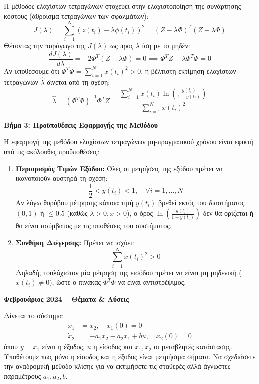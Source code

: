\documentclass[a4paper,11pt]{article}
\newcommand{\examyear}[1]{\def\currentexamyear{#1}\markboth{#1}{#1}}
\def\currentexamyear{}
\begin{document}
\begin{answer}
Η μέθοδος ελαχίστων τετραγώνων στοχεύει στην ελαχιστοποίηση της συνάρτησης κόστους (άθροισμα τετραγώνων των σφαλμάτων):
\[ J(\lambda) = \sum_{i=1}^N \left( z(t_i) - \lambda \phi(t_i) \right)^2 = (Z - \lambda \Phi)^T (Z - \lambda \Phi) \]
Θέτοντας την παράγωγο της $J(\lambda)$ ως προς $\lambda$ ίση με το μηδέν:
\[ \frac{d J(\lambda)}{d \lambda} = -2 \Phi^T (Z - \lambda \Phi) = 0 \implies \Phi^T Z - \lambda \Phi^T \Phi = 0 \]
Αν υποθέσουμε ότι $\Phi^T \Phi = \sum_{i=1}^N x(t_i)^2 > 0$, η βέλτιστη εκτίμηση ελαχίστων τετραγώνων $\hat{\lambda}$ δίνεται από τη σχέση:
\[ \hat{\lambda} = (\Phi^T \Phi)^{-1} \Phi^T Z = \frac{\sum_{i=1}^N x(t_i) \ln\left(\frac{y(t_i)}{1 - y(t_i)}\right)}{\sum_{i=1}^N x(t_i)^2} \]

\textbf{Βήμα 3: Προϋποθέσεις Εφαρμογής της Μεθόδου}

Η εφαρμογή της μεθόδου ελαχίστων τετραγώνων μη-πραγματικού χρόνου είναι εφικτή υπό τις ακόλουθες προϋποθέσεις:
\begin{enumerate}
    \item \textbf{Περιορισμός Τιμών Εξόδου:} Όλες οι μετρήσεις της εξόδου πρέπει να ικανοποιούν αυστηρά τη σχέση:
    \[ \frac{1}{2} < y(t_i) < 1, \quad \forall i=1,\dots,N \]
    Αν λόγω θορύβου μέτρησης κάποια τιμή $y(t_i)$ βρεθεί εκτός του διαστήματος $(0, 1)$ ή $\le 0.5$ (καθώς $\lambda > 0, x > 0$), ο όρος $\ln\left(\frac{y(t_i)}{1-y(t_i)}\right)$ δεν θα ορίζεται ή θα είναι ασύμβατος με τις υποθέσεις του συστήματος.
    \item \textbf{Συνθήκη Διέγερσης:} Πρέπει να ισχύει:
    \[ \sum_{i=1}^N x(t_i)^2 > 0 \]
    Δηλαδή, τουλάχιστον μία μέτρηση της εισόδου πρέπει να είναι μη μηδενική ($x(t_i) \ne 0$), ώστε ο πίνακας $\Phi^T \Phi$ να είναι αντιστρέψιμος.
\end{enumerate}
\end{answer}

\newpage

\hypertarget{exam3}{}
\examyear{Φεβρουάριος 2024}

\begin{center}
\textbf{\Large Φεβρουάριος 2024 -- Θέματα \& Λύσεις}
\end{center}

\begin{question}
Δίνεται το σύστημα:
\begin{align}
    \dot{x}_1 &= x_2, \quad x_1(0) = 0 \\
    \dot{x}_2 &= -a_1 x_2 - a_2 x_1 + b u, \quad x_2(0) = 0
\end{align}
όπου $y = x_1$ είναι η έξοδος, $u$ η είσοδος και $x_1, x_2$ οι μεταβλητές κατάστασης. Υποθέτουμε πως μόνο η είσοδος και η έξοδος είναι μετρήσιμα σήματα. Να σχεδιάσετε την αναδρομική μέθοδο κλίσης για να εκτιμήσετε τις σταθερές αλλά άγνωστες παραμέτρους $a_1, a_2, b$.
\end{question}
\end{document}
